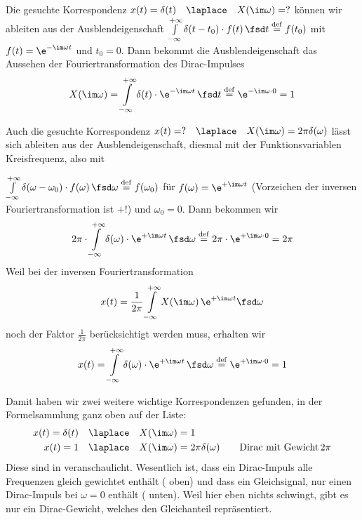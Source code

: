 \cleardoublepage
\begin{Ansatz}
Die gesuchte Korrespondenz $x(t)=\delta(t)\quad \laplace \quad X(\im\omega)=?$
können wir ableiten aus der Ausblendeigenschaft
$\int\limits_{-\infty}^{+\infty} \delta(t-t_0) \cdot f(t) \, \fsd t \stackrel{\mathrm{def}}= f(t_0)$
mit $f(t) = \e^{-\im \omega t}$ und $t_0=0$.
%
Dann bekommt die Ausblendeigenschaft das Aussehen der Fouriertransformation
des Dirac-Impulses
\begin{equation}
X(\im\omega) = \int\limits_{-\infty}^{+\infty} \delta(t) \cdot \e^{-\im \omega t} \, \fsd t \stackrel{\mathrm{def}}= \e^{-\im \omega \cdot 0} = 1
\end{equation}

Auch die gesuchte Korrespondenz
$x(t)= ? \quad \laplace \quad X(\im\omega)=2\pi \delta(\omega)$ lässt sich
ableiten aus der Ausblendeigenschaft, diesmal mit der Funktionsvariablen Kreisfrequenz, also mit

$\int\limits_{-\infty}^{+\infty} \delta(\omega-\omega_0) \cdot f(\omega) \, \fsd \omega \stackrel{\mathrm{def}}= f(\omega_0)$
für $f(\omega) = \e^{+\im \omega t}$ (Vorzeichen der inversen Fouriertransformation ist $+$!) und $\omega_0=0$.
%
Dann bekommen wir
\begin{equation}
2\pi \cdot \int\limits_{-\infty}^{+\infty} \delta(\omega) \cdot \e^{+\im \omega t} \, \fsd \omega \stackrel{\mathrm{def}}= 2\pi \cdot \e^{+\im \omega \cdot 0} = 2\pi
\end{equation}
%
Weil bei der inversen Fouriertransformation
\begin{align}
x(t) = \frac{1}{2\pi} \int\limits_{-\infty}^{+\infty} X(\im\omega) \, \e^{+\im \omega t} \fsd \omega
\end{align}
noch der Faktor $\frac{1}{2\pi}$ berücksichtigt werden muss, erhalten wir
\begin{equation}
x(t) = \int\limits_{-\infty}^{+\infty} \delta(\omega) \cdot \e^{+\im \omega t} \, \fsd \omega \stackrel{\mathrm{def}}= \e^{+\im \omega \cdot 0} = 1
\end{equation}

\end{Ansatz}
\begin{Loesung}
Damit haben wir zwei weitere wichtige Korrespondenzen gefunden, in der Formelsammlung
ganz oben auf der Liste:
\begin{align}
\label{eq:D410BDAAE0_Loesung1}
x(t)= \delta(t) &\quad \laplace \quad X(\im\omega)=1\\
\label{eq:D410BDAAE0_Loesung2}
x(t)= 1 &\quad \laplace \quad X(\im\omega)=2\pi \delta(\omega)\qquad \text{Dirac mit Gewicht}\,2\pi
\end{align}
%
Diese sind in  veranschaulicht.
%
Wesentlich ist, dass ein Dirac-Impuls alle Frequenzen gleich gewichtet enthält
( oben)
und dass ein Gleichsignal, nur einen Dirac-Impuls bei $\omega=0$ enthält
( unten).
Weil hier eben nichts schwingt, gibt es nur ein Dirac-Gewicht, welches den
Gleichanteil repräsentiert.
\end{Loesung}




